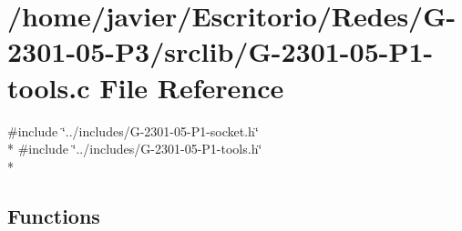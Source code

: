 \hypertarget{_g-2301-05-_p1-tools_8c}{\section{/home/javier/\-Escritorio/\-Redes/\-G-\/2301-\/05-\/\-P3/srclib/\-G-\/2301-\/05-\/\-P1-\/tools.c File Reference}
\label{_g-2301-05-_p1-tools_8c}
}
{\ttfamily \#include \char`\"{}../includes/\-G-\/2301-\/05-\/\-P1-\/socket.\-h\char`\"{}}\\*
{\ttfamily \#include \char`\"{}../includes/\-G-\/2301-\/05-\/\-P1-\/tools.\-h\char`\"{}}\\*
\subsection*{Functions}
